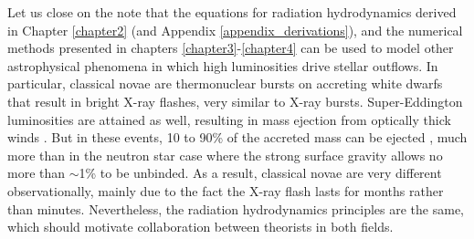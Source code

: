 \documentclass[../main.tex]{subfiles}
\begin{document}
Let us close on the note that the equations for radiation hydrodynamics derived in Chapter \ref{chapter2} (and Appendix \ref{appendix_derivations}), and the numerical methods presented in chapters \ref{chapter3}-\ref{chapter4} can be used to model other astrophysical phenomena in which high luminosities drive stellar outflows. In particular, classical novae are thermonuclear bursts on accreting white dwarfs that result in bright X-ray flashes, very similar to X-ray bursts. Super-Eddington luminosities are attained as well, resulting in mass ejection from optically thick winds \citep{Kato1983}. But in these events, 10 to 90\% of the accreted mass can be ejected \citep{Lewin2006}, much more than in the neutron star case where the strong surface gravity allows no more than ${\sim}$1\% to be unbinded. As a result, classical novae are very different observationally, mainly due to the fact the X-ray flash lasts for months rather than minutes. Nevertheless, the radiation hydrodynamics principles are the same, which should motivate collaboration between theorists in both fields.

\biblio
\end{document}
